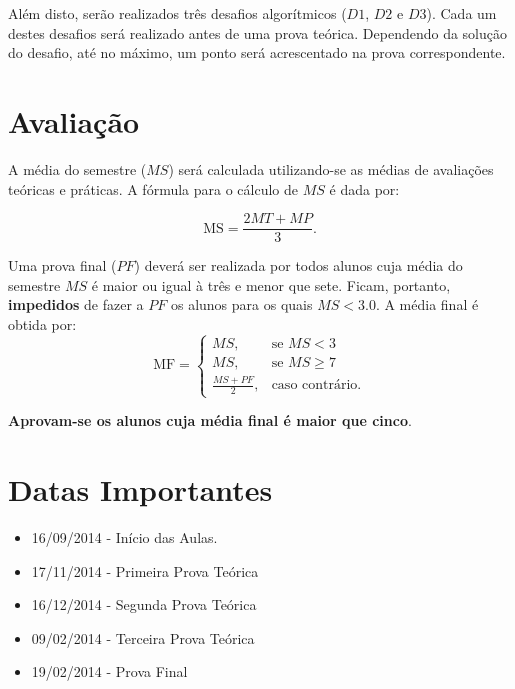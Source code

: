 \documentclass[12pt]{article}
\begin{document}
Al\'em disto, ser\~ao realizados tr\^es desafios algor\'itmicos ($D1$, $D2$ e $D3$). 
Cada um destes desafios ser\'a realizado antes de uma prova te\'orica. Dependendo da solu\c{c}\~ao do desafio, at\'e no m\'aximo, um ponto ser\'a acrescentado na prova correspondente.

\section{Avalia\c{c}\~ao }

A m\'edia do semestre ($MS$) ser\'a calculada utilizando-se as m\'edias de avalia\c{c}\~oes te\'oricas e pr\'aticas.
A f\'ormula para o c\'alculo de $MS$ \'e dada por:

\begin{equation}
\mathrm{MS} = \frac{2MT + MP}{3}.
\end{equation}


Uma prova final ($PF$) dever\'a ser realizada por todos alunos cuja m\'edia do semestre $MS$ \'e maior ou igual \`a tr\^es e menor que sete.
Ficam, portanto, {\bf impedidos} de fazer a $PF$ os alunos para os quais $MS  < 3.0$. A m\'edia final \'e obtida por:
\begin{equation} 
\mathrm{MF} = \begin{cases} MS, & \mbox{se } MS < 3 \\ MS, & \mbox{se } MS \geq 7 \\ \frac{MS+PF}{2}, & \mbox{caso contr\'ario.}  \end{cases}
\end{equation}

{\bf Aprovam-se os alunos cuja m\'edia final \'e maior que cinco}. 



\section{Datas Importantes}
\begin{itemize}
\item 16/09/2014 - In\'icio das Aulas.
\item 17/11/2014 - Primeira Prova Te\'orica
\item 16/12/2014 - Segunda Prova Te\'orica
\item 09/02/2014 - Terceira Prova Te\'orica
\item 19/02/2014 - Prova Final
\end{itemize}
\end{document}
